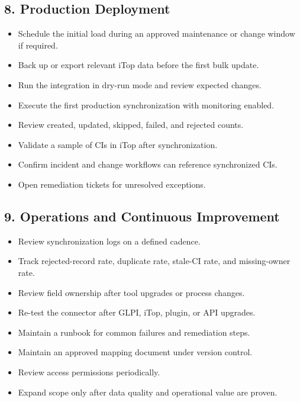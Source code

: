 \documentclass[11pt]{article}
\newcommand{\checkbox}{\fbox{\rule{0pt}{1.1ex}\rule{1.1ex}{0pt}}}
\begin{document}
\subsection{8. Production Deployment}
\begin{itemize}
  \item[\checkbox] Schedule the initial load during an approved maintenance or change window if required.
  \item[\checkbox] Back up or export relevant iTop data before the first bulk update.
  \item[\checkbox] Run the integration in dry-run mode and review expected changes.
  \item[\checkbox] Execute the first production synchronization with monitoring enabled.
  \item[\checkbox] Review created, updated, skipped, failed, and rejected counts.
  \item[\checkbox] Validate a sample of CIs in iTop after synchronization.
  \item[\checkbox] Confirm incident and change workflows can reference synchronized CIs.
  \item[\checkbox] Open remediation tickets for unresolved exceptions.
\end{itemize}

\subsection{9. Operations and Continuous Improvement}
\begin{itemize}
  \item[\checkbox] Review synchronization logs on a defined cadence.
  \item[\checkbox] Track rejected-record rate, duplicate rate, stale-CI rate, and missing-owner rate.
  \item[\checkbox] Review field ownership after tool upgrades or process changes.
  \item[\checkbox] Re-test the connector after GLPI, iTop, plugin, or API upgrades.
  \item[\checkbox] Maintain a runbook for common failures and remediation steps.
  \item[\checkbox] Maintain an approved mapping document under version control.
  \item[\checkbox] Review access permissions periodically.
  \item[\checkbox] Expand scope only after data quality and operational value are proven.
\end{itemize}
\end{document}
